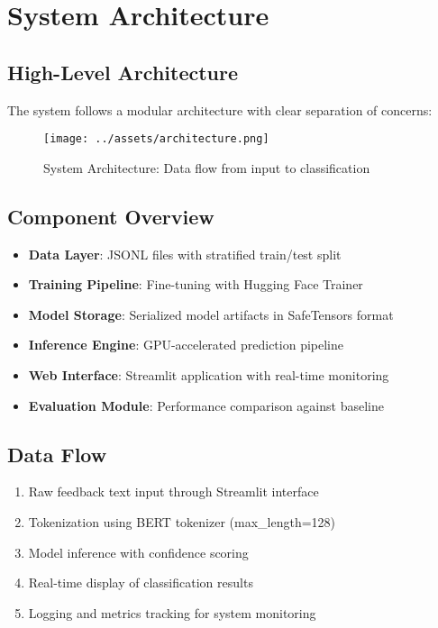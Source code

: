 \documentclass[11pt,a4paper]{article}
\begin{document}
\section{System Architecture}

\subsection{High-Level Architecture}
The system follows a modular architecture with clear separation of concerns:

\begin{figure}[h!]
  \centering
  \texttt{[image: ../assets/architecture.png]}
  \caption{System Architecture: Data flow from input to classification}
\end{figure}

\subsection{Component Overview}
\begin{itemize}
  \item \textbf{Data Layer}: JSONL files with stratified train/test split
  \item \textbf{Training Pipeline}: Fine-tuning with Hugging Face Trainer
  \item \textbf{Model Storage}: Serialized model artifacts in SafeTensors format
  \item \textbf{Inference Engine}: GPU-accelerated prediction pipeline
  \item \textbf{Web Interface}: Streamlit application with real-time monitoring
  \item \textbf{Evaluation Module}: Performance comparison against baseline
\end{itemize}

\subsection{Data Flow}
\begin{enumerate}
  \item Raw feedback text input through Streamlit interface
  \item Tokenization using BERT tokenizer (max\_length=128)
  \item Model inference with confidence scoring
  \item Real-time display of classification results
  \item Logging and metrics tracking for system monitoring
\end{enumerate}
\end{document}
